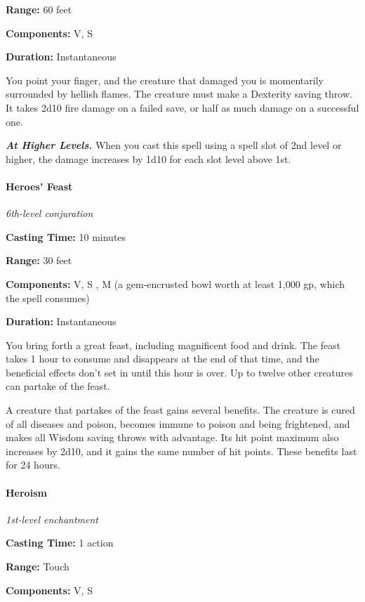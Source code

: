 \documentclass[
]{article}
\begin{document}
\textbf{Range:} 60 feet

\textbf{Components:} V, S

\textbf{Duration:} Instantaneous

You point your finger, and the creature that damaged you is momentarily
surrounded by hellish flames. The creature must make a Dexterity saving
throw. It takes 2d10 fire damage on a failed save, or half as much
damage on a successful one.

\emph{\textbf{At Higher Levels.}} When you cast this spell using a spell
slot of 2nd level or higher, the damage increases by 1d10 for each slot
level above 1st.

\hypertarget{heroes-feast}{%
\paragraph{Heroes' Feast}\label{heroes-feast}}

\emph{6th-level conjuration}

\textbf{Casting Time:} 10 minutes

\textbf{Range:} 30 feet

\textbf{Components:} V, S , M (a gem-encrusted bowl worth at least 1,000
gp, which the spell consumes)

\textbf{Duration:} Instantaneous

You bring forth a great feast, including magnificent food and drink. The
feast takes 1 hour to consume and disappears at the end of that time,
and the beneficial effects don't set in until this hour is over. Up to
twelve other creatures can partake of the feast.

A creature that partakes of the feast gains several benefits. The
creature is cured of all diseases and poison, becomes immune to poison
and being frightened, and makes all Wisdom saving throws with advantage.
Its hit point maximum also increases by 2d10, and it gains the same
number of hit points. These benefits last for 24 hours.

\hypertarget{heroism}{%
\paragraph{Heroism}\label{heroism}}

\emph{1st-level enchantment}

\textbf{Casting Time:} 1 action

\textbf{Range:} Touch

\textbf{Components:} V, S
\end{document}
